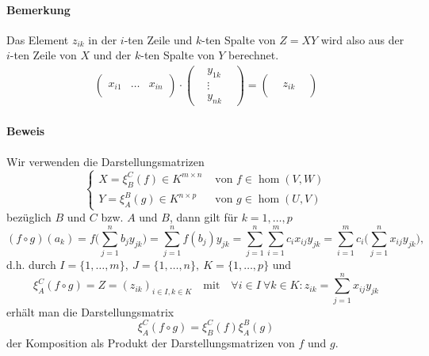 	\paragraph{Bemerkung}
		Das Element $ z_{ik} $ in der $ i $-ten Zeile und $ k $-ten Spalte von $ Z = XY $ wird also aus der $ i $-ten Zeile von $ X $ und der $k$-ten Spalte von $ Y $ berechnet.
		\begin{align*}
			\left(
			\begin{array}{ccc}
			       &        &        \\
			x_{i1} & \dots  & x_{in} \\
			       &        &        
			\end{array}
			\right)
			\cdot
			\left(
			\begin{array}{ccc}
			       & y_{1k} &        \\
			       & \vdots &        \\
			       & y_{nk} &        
			\end{array}
			\right)
			=
			\left(
			\begin{array}{ccc}
			       &        &	     \\
			       & z_{ik} &        \\
			       &        &        
			\end{array}
			\right)
		\end{align*}
	\paragraph{Beweis}
		Wir verwenden die Darstellungsmatrizen
		\[
			\begin{cases}
				X = \xi^C_B(f)\in K^{m\times n} & \text{ von } f\in \hom(V,W) \\
				Y = \xi_A^B(g)\in K^{n\times p} & \text{ von } g\in \hom(U,V)
			\end{cases}
		\]
		bezüglich $ B $ und $ C $ bzw. $ A $ und $ B $, dann gilt für $ k=1,\dots,p $
		\[
			(f\circ g)(a_k)=f\Big(\sum_{j=1}^{n}b_jy_{jk}\Big) = \sum_{j=1}^{n}f(b_j)y_{jk} = \sum_{j=1}^{n}\sum_{i=1}^{m}c_ix_{ij}y_{jk} = \sum_{i=1}^{m}c_i\Big(\sum_{j=1}^{n}x_{ij}y_{jk}\Big),
		\]
		d.h. durch $ I=\{1,\dots,m\},\ J=\{1,\dots,n\},\ K=\{1,\dots,p\} $ und
		\[
			\xi_A^C(f\circ g) = Z = (z_{ik})_{i\in I,k\in K} \quad\text{mit}\quad \forall i\in I\ \forall k\in K: z_{ik}= \sum_{j=1}^{n}x_{ij}y_{jk}
		\]
		erhält man die Darstellungsmatrix
		\[
			\xi_A^C(f\circ g) = \xi_B^C(f)\xi_A^B(g)
		\]
		der Komposition als Produkt der Darstellungsmatrizen von $ f $ und $ g $.
